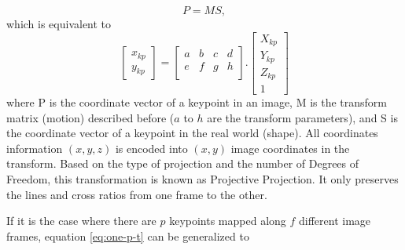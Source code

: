 \documentclass[]{IEEEtran}
\begin{document}
\begin{equation}
    P = MS,
    \label{eq:sfm}
\end{equation}
which is equivalent to
\begin{equation}
    \begin{bmatrix}
        x_{kp} \\ y_{kp}
    \end{bmatrix} = 
    \begin{bmatrix}
        a & b & c & d \\
        e & f & g & h \\
    \end{bmatrix}.
    \begin{bmatrix}
        X_{kp} \\ Y_{kp} \\ Z_{kp} \\ 1
        \label{eq:one-p-t}
    \end{bmatrix}
\end{equation}
where P is the coordinate vector of a keypoint in an image, M is the transform matrix (motion) described before ($a$ to $h$ are the transform parameters), and S is the coordinate vector of a keypoint in the real world (shape). All coordinates information $(x, y, z)$ is encoded into $(x,y)$ image coordinates in the transform. Based on the type of projection and the number of Degrees of Freedom, this transformation is known as Projective Projection. It only preserves the lines and cross ratios from one frame to the other.
\par If it is the case where there are $p$ keypoints mapped along $f$ different image frames, equation \ref{eq:one-p-t} can be generalized to
\end{document}
